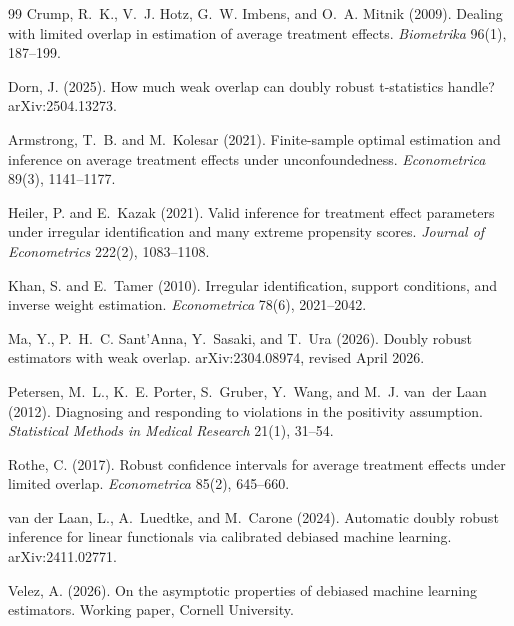 \documentclass[11pt]{article}
\theoremstyle{definition}
\theoremstyle{plain}
\theoremstyle{remark}
\begin{document}
\begin{thebibliography}{99}
Crump, R.~K., V.~J. Hotz, G.~W. Imbens, and O.~A. Mitnik (2009).
\newblock Dealing with limited overlap in estimation of average treatment effects.
\newblock \textit{Biometrika} 96(1), 187--199.

Dorn, J. (2025).
\newblock How much weak overlap can doubly robust t-statistics handle?
\newblock arXiv:2504.13273.

Armstrong, T.~B. and M.~Kolesar (2021).
\newblock Finite-sample optimal estimation and inference on average treatment effects under unconfoundedness.
\newblock \textit{Econometrica} 89(3), 1141--1177.

Heiler, P. and E.~Kazak (2021).
\newblock Valid inference for treatment effect parameters under irregular identification and many extreme propensity scores.
\newblock \textit{Journal of Econometrics} 222(2), 1083--1108.

Khan, S. and E.~Tamer (2010).
\newblock Irregular identification, support conditions, and inverse weight estimation.
\newblock \textit{Econometrica} 78(6), 2021--2042.

Ma, Y., P.~H.~C. Sant'Anna, Y.~Sasaki, and T.~Ura (2026).
\newblock Doubly robust estimators with weak overlap.
\newblock arXiv:2304.08974, revised April 2026.

Petersen, M.~L., K.~E. Porter, S.~Gruber, Y.~Wang, and M.~J. van~der Laan (2012).
\newblock Diagnosing and responding to violations in the positivity assumption.
\newblock \textit{Statistical Methods in Medical Research} 21(1), 31--54.

Rothe, C. (2017).
\newblock Robust confidence intervals for average treatment effects under limited overlap.
\newblock \textit{Econometrica} 85(2), 645--660.

van der Laan, L., A.~Luedtke, and M.~Carone (2024).
\newblock Automatic doubly robust inference for linear functionals via calibrated debiased machine learning.
\newblock arXiv:2411.02771.

Velez, A. (2026).
\newblock On the asymptotic properties of debiased machine learning estimators.
\newblock Working paper, Cornell University.
\end{thebibliography}
\end{document}
